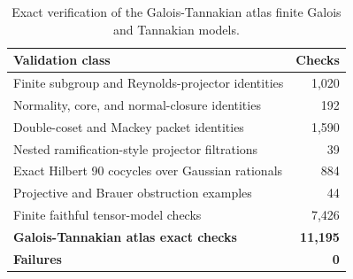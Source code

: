 \begin{table}[htbp]
\centering
\caption{Exact verification of the Galois-Tannakian atlas finite Galois and Tannakian models.}
\label{tab:block12-validation}
\small
\begin{tabularx}{\textwidth}{@{}Y r@{}}
\toprule
Validation class & Checks\\
\midrule
Finite subgroup and Reynolds-projector identities & 1,020\\
Normality, core, and normal-closure identities & 192\\
Double-coset and Mackey packet identities & 1,590\\
Nested ramification-style projector filtrations & 39\\
Exact Hilbert 90 cocycles over Gaussian rationals & 884\\
Projective and Brauer obstruction examples & 44\\
Finite faithful tensor-model checks & 7,426\\
\midrule
\textbf{Galois-Tannakian atlas exact checks} & \textbf{11,195}\\
\textbf{Failures} & \textbf{0}\\
\bottomrule
\end{tabularx}
\end{table}
